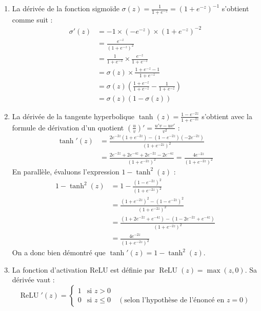 \documentclass[]{../exercices}
\begin{document}
\begin{solution}
\begin{enumerate}
    \item La dérivée de la fonction sigmoïde $\sigma(z) = \frac{1}{1 + e^{-z}} = (1 + e^{-z})^{-1}$ s'obtient comme suit :
    \begin{align*}
        \sigma'(z) &= -1 \times (-e^{-z}) \times (1 + e^{-z})^{-2} \\
        &= \frac{e^{-z}}{(1 + e^{-z})^2} \\
        &= \frac{1}{1 + e^{-z}} \times \frac{e^{-z}}{1 + e^{-z}} \\
        &= \sigma(z) \times \frac{1 + e^{-z} - 1}{1 + e^{-z}} \\
        &= \sigma(z) \left( \frac{1 + e^{-z}}{1 + e^{-z}} - \frac{1}{1 + e^{-z}} \right) \\
        &= \sigma(z) (1 - \sigma(z))
    \end{align*}

    \item La dérivée de la tangente hyperbolique $\tanh(z) = \frac{1 - e^{-2z}}{1 + e^{-2z}}$ s'obtient avec la formule de dérivation d'un quotient $\left(\frac{u}{v}\right)' = \frac{u'v - uv'}{v^2}$ :
    \begin{align*}
        \tanh'(z) &= \frac{2e^{-2z}(1 + e^{-2z}) - (1 - e^{-2z})(-2e^{-2z})}{(1 + e^{-2z})^2} \\
        &= \frac{2e^{-2z} + 2e^{-4z} + 2e^{-2z} - 2e^{-4z}}{(1 + e^{-2z})^2} = \frac{4e^{-2z}}{(1 + e^{-2z})^2}
    \end{align*}
    En parallèle, évaluons l'expression $1 - \tanh^2(z)$ :
    \begin{align*}
        1 - \tanh^2(z) &= 1 - \frac{(1 - e^{-2z})^2}{(1 + e^{-2z})^2} \\
        &= \frac{(1 + e^{-2z})^2 - (1 - e^{-2z})^2}{(1 + e^{-2z})^2} \\
        &= \frac{(1 + 2e^{-2z} + e^{-4z}) - (1 - 2e^{-2z} + e^{-4z})}{(1 + e^{-2z})^2} \\
        &= \frac{4e^{-2z}}{(1 + e^{-2z})^2}
    \end{align*}
    On a donc bien démontré que $\tanh'(z) = 1 - \tanh^2(z)$.

    \item La fonction d'activation ReLU est définie par $\operatorname{ReLU}(z) = \max(z, 0)$. Sa dérivée vaut :
    \begin{equation*}
        \operatorname{ReLU}'(z) = \begin{cases}
            1 & \text{si } z > 0 \\
            0 & \text{si } z \leq 0 \quad (\text{selon l'hypothèse de l'énoncé en } z=0)
        \end{cases}
    \end{equation*}


\end{enumerate}
\end{solution}
\end{document}
